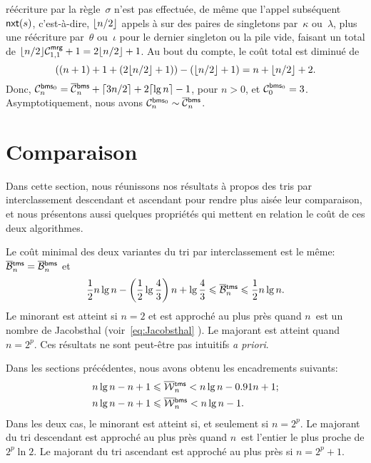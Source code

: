 réécriture par la règle~\(\sigma\) n'est pas effectuée, de même que
l'appel subséquent \(\fun{nxt}(s)\),
c'est-à-dire, \(\floor{n/2}\) appels à
 sur des paires de singletons
par~\(\kappa\) ou~\(\lambda\), plus une réécriture par~\(\theta\)
ou~\(\iota\) pour le dernier singleton ou la pile vide, faisant un
total de \(\floor{n/2}\C{\fun{mrg}}{1,1} + 1 = 2\floor{n/2} + 1\). Au
bout du compte, le coût total est diminué de
\begin{equation*}
  ((n+1) + 1 + (2\floor{n/2}+1)) - (\floor{n/2}+1) = n + \floor{n/2} +
  2.
\end{equation*}
Donc, \(\C{\fun{bms}_0}{n} = \OC{\fun{bms}}{n} + \ceiling{3n/2} +
2\ceiling{\lg n} - 1\), pour \(n>0\), et \(\C{\fun{bms}_0}{0} =
3\). Asymptotiquement, nous avons \(\C{\fun{bms}_0}{n} \sim
\OC{\fun{bms}}{n}\).

\section{Comparaison}

Dans cette section, nous réunissons nos résultats à propos des tris
par interclassement descendant et ascendant pour rendre plus aisée
leur comparaison, et nous présentons aussi quelques propriétés qui
mettent en relation le coût de ces deux algorithmes.


Le coût minimal des deux variantes du tri par interclassement est le
même: \(\OB{\fun{tms}}{n} = \OB{\fun{bms}}{n}\) et
\begin{equation*}
\frac{1}{2}n\lg n - \left(\frac{1}{2}\lg\frac{4}{3}\right)n +
\lg\frac{4}{3} \leqslant \OB{\fun{tms}}{n} \leqslant \frac{1}{2}n\lg
n.
\end{equation*}
Le minorant est atteint si \(n=2\) et est approché au plus près quand
\(n\)~est un nombre de Jacobsthal
(voir~\eqref{eq:Jacobsthal} ). Le majorant est
atteint quand \(n=2^p\). Ces résultats ne sont peut-être pas
intuitifs \emph{a priori}.


Dans les sections précédentes, nous avons obtenu les encadrements
suivants:
\begin{align*}
n\lg n - n + 1 &\leqslant \OW{\fun{tms}}{n} <
n\lg n - 0.91 n + 1;\\
n\lg n - n + 1 &\leqslant \OW{\fun{bms}}{n} < n\lg n - 1.
\end{align*}
Dans les deux cas, le minorant est atteint si, et seulement si
\(n=2^p\). Le majorant du tri descendant est approché au plus près
quand \(n\)~est l'entier le plus proche de \(2^p\ln 2\). Le majorant
du tri ascendant est approché au plus près si \(n=2^p+1\).

